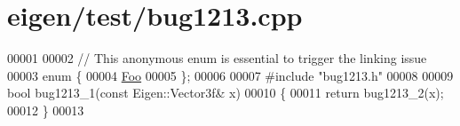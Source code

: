 \hypertarget{eigen_2test_2bug1213_8cpp_source}{}\section{eigen/test/bug1213.cpp}
\label{eigen_2test_2bug1213_8cpp_source}

\begin{DoxyCode}
00001 
00002 \textcolor{comment}{// This anonymous enum is essential to trigger the linking issue}
00003 \textcolor{keyword}{enum} \{
00004   \hyperlink{struct_foo}{Foo}
00005 \};
00006 
00007 \textcolor{preprocessor}{#include "bug1213.h"}
00008 
00009 \textcolor{keywordtype}{bool} bug1213\_1(\textcolor{keyword}{const} Eigen::Vector3f& x)
00010 \{
00011   \textcolor{keywordflow}{return} bug1213\_2(x);
00012 \}
00013 
\end{DoxyCode}
